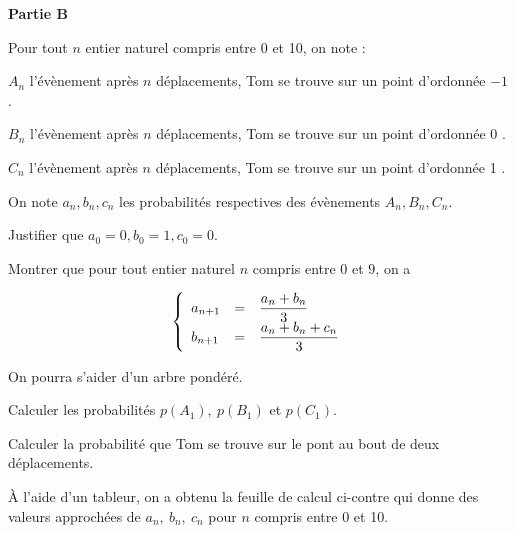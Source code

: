 \documentclass[10pt]{article}
\begin{document}
\bigskip
 
\textbf{Partie B}

\medskip
 
Pour tout $n$ entier naturel compris entre 0 et 10, on note : 

$A_{n}$ l'évènement \og après $n$ déplacements, Tom se trouve sur un point d'ordonnée $- 1$ \fg.

$B_{n}$ l'évènement \og après $n$ déplacements, Tom se trouve sur un point d'ordonnée 0 \fg.

$C_{n}$ l'évènement \og après $n$ déplacements, Tom se trouve sur un point d'ordonnée 1 \fg.
 
On note $a_{n}, b_{n}, c_{n}$ les probabilités respectives des évènements $A_{n}, B_{n}, C_{n}$.

\medskip
 
\begin{enumerate}
\item Justifier que $a_{0} = 0, b_{0} = 1, c_{0} = 0$. 
\item Montrer que pour tout entier naturel $n$ compris entre $0$ et $9$, on a 
 
\[\left\{\begin{array}{l c l}
a_{n+1} &=& \dfrac{a_{n} + b_{n}}{3}\\ 
b_{n+1} &=& \dfrac{a_{n} + b_{n} + c_{n}}{3}
\end{array}\right.\]


On pourra s'aider d'un arbre pondéré. 
\item Calculer les probabilités $p\left(A_{1}\right),\: p\left(B_{1}\right)$ et $p\left(C_{1}\right)$. 
\item Calculer la probabilité que Tom se trouve sur le pont au bout de deux déplacements. 

\parbox{0.35\linewidth}{\item À l'aide d'un tableur, on a obtenu la feuille de calcul ci-contre qui donne des valeurs approchées de $a_{n},\: b_{n},\: c_{n}$ pour $n$ compris entre 0 et 10.
 
}
\end{enumerate}
\end{document}
